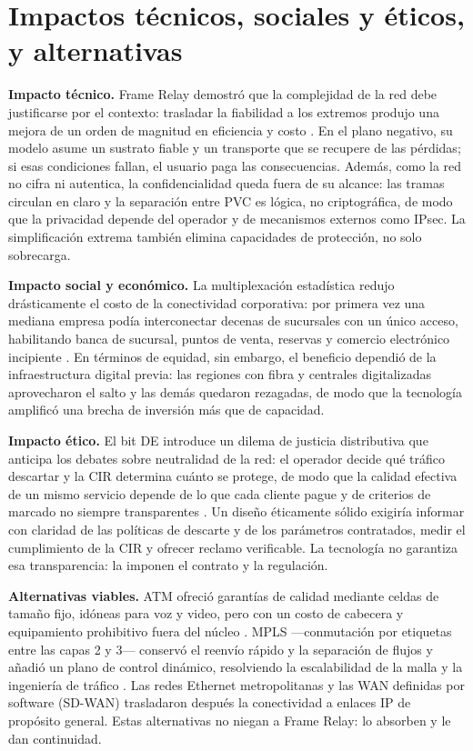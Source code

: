 \documentclass[12pt,a4paper]{article}
\begin{document}
\section{Impactos técnicos, sociales y éticos, y alternativas}

\textbf{Impacto técnico.} Frame Relay demostró que la complejidad de la red debe justificarse por el contexto: trasladar la fiabilidad a los extremos produjo una mejora de un orden de magnitud en eficiencia y costo \cite{stallings2014, saltzer1984}. En el plano negativo, su modelo asume un sustrato fiable y un transporte que se recupere de las pérdidas; si esas condiciones fallan, el usuario paga las consecuencias. Además, como la red no cifra ni autentica, la confidencialidad queda fuera de su alcance: las tramas circulan en claro y la separación entre PVC es lógica, no criptográfica, de modo que la privacidad depende del operador y de mecanismos externos como IPsec. La simplificación extrema también elimina capacidades de protección, no solo sobrecarga.

\textbf{Impacto social y económico.} La multiplexación estadística redujo drásticamente el costo de la conectividad corporativa: por primera vez una mediana empresa podía interconectar decenas de sucursales con un único acceso, habilitando banca de sucursal, puntos de venta, reservas y comercio electrónico incipiente \cite{buckwalter1999}. En términos de equidad, sin embargo, el beneficio dependió de la infraestructura digital previa: las regiones con fibra y centrales digitalizadas aprovecharon el salto y las demás quedaron rezagadas, de modo que la tecnología amplificó una brecha de inversión más que de capacidad.

\textbf{Impacto ético.} El bit DE introduce un dilema de justicia distributiva que anticipa los debates sobre neutralidad de la red: el operador decide qué tráfico descartar y la CIR determina cuánto se protege, de modo que la calidad efectiva de un mismo servicio depende de lo que cada cliente pague y de criterios de marcado no siempre transparentes \cite{cisco, kurose2017}. Un diseño éticamente sólido exigiría informar con claridad de las políticas de descarte y de los parámetros contratados, medir el cumplimiento de la CIR y ofrecer reclamo verificable. La tecnología no garantiza esa transparencia: la imponen el contrato y la regulación.

\textbf{Alternativas viables.} ATM ofreció garantías de calidad mediante celdas de tamaño fijo, idóneas para voz y video, pero con un costo de cabecera y equipamiento prohibitivo fuera del núcleo \cite{mcdysan1995}. MPLS ---conmutación por etiquetas entre las capas 2 y 3--- conservó el reenvío rápido y la separación de flujos y añadió un plano de control dinámico, resolviendo la escalabilidad de la malla y la ingeniería de tráfico \cite{rfc3031, davie2000}. Las redes Ethernet metropolitanas y las WAN definidas por software (SD-WAN) trasladaron después la conectividad a enlaces IP de propósito general. Estas alternativas no niegan a Frame Relay: lo absorben y le dan continuidad.
\end{document}
